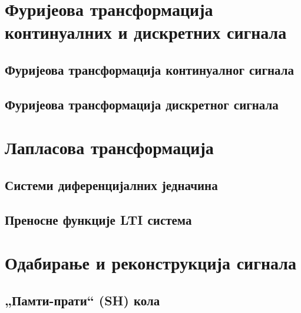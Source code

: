 \setcounter{fid}{0}
\graphicspath{{./2_furijeovi_redovi/1_kontinualni/}}
\noindent

\vspace*{\ProblemSep}
\section{Фуријеова трансформација континуалних и дискретних сигнала}
\subsection{Фуријеова трансформација континуалног сигнала}

\setcounter{fid}{0}
\graphicspath{{./3_furijeove_tranformacije/1_CT/}}
\noindent

\vspace*{\ProblemSep}
\subsection{Фуријеова трансформација дискретног сигнала}
\section{Лапласова трансформација}
\subsection{Системи диференцијалних једначина}

\setcounter{fid}{0}
\graphicspath{{./4_laplasova_transformacija/2_sistemi_dif_jna/}}
\noindent

\vspace*{\ProblemSep}
\subsection{Преносне функције LTI система}

\setcounter{fid}{0}
\graphicspath{{./4_laplasova_transformacija/3_fje_prenosa/}}
\noindent

\vspace*{\ProblemSep}
\section{Одабирање и реконструкција сигнала}
\subsection{„Памти-прати“ (SH) кола}

